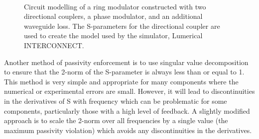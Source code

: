 \documentclass[journal]{spie}
\begin{document}
\begin{figure}[tbp]
\begin{center}   
 ~ ~ ~
\caption{Circuit modelling of a ring modulator constructed with two directional couplers, a phase modulator, and an additional waveguide loss.  The S-parameters for the directional coupler are used to create the model used by the simulator, Lumerical INTERCONNECT.  %
}
\label{INT_DC}
\end{center}
\end{figure}

Another method of passivity enforcement is to use singular value decomposition to ensure that the 2-norm of the S-parameter is always less than or equal to 1. This method is very simple and appropriate for many components where the numerical or experimental errors are small. However, it will lead to discontinuities in the derivatives of S with frequency which can be problematic for some components, particularly those with a high level of feedback. A slightly modified approach is to scale the 2-norm over all frequencies by a single value (the maximum passivity violation) which avoids any discontinuities in the derivatives.
\end{document}
